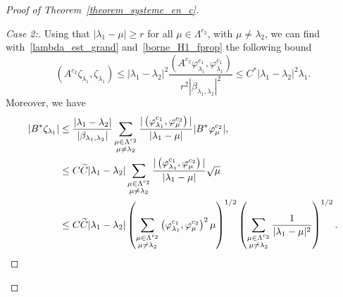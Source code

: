 \documentclass[AHL,Unicode,longabstracts]{cedram}
\newenvironment{step}[1]{\begin{proof}[#1]}{\let\qed\relax\end{proof}}
\newcommand{\fprop}[2]{\varphi^{#1}_{#2}}
\let\oldtilde\tilde
\renewcommand*{\tilde}[1]{\mathchoice{\widetilde{#1}}{\widetilde{#1}}{\oldtilde{#1}}{\oldtilde{#1}}}\let\oldexists\exists
\renewcommand*{\exists}{\mathrel{\oldexists}}
\begin{document}
\begin{proof}[Proof of Theorem~\ref{theorem_systeme_en_c}]
\begin{step}{Case 2:}
Using that $|\lambda_1-\mu|\geq r$ for all $\mu\in \Lambda^{c_2}$, with $\mu\neq \lambda_2$, we can find with~\eqref{lambda_est_grand} and~\eqref{borne_H1_fprop} the following bound
\begin{equation}\label{borne_chi_lambda1}
\left(A^{c_2} \zeta_{\lambda_1},\zeta_{\lambda_1}\right) \leq |\lambda_1-\lambda_2|^2 \frac{\left(A^{c_2} \fprop{c_1}{\lambda_1}, \fprop{c_1}{\lambda_1}\right)}{r^2|\beta_{\lambda_1,\lambda_2}|^2} \leq C^* |\lambda_1-\lambda_2|^2 \lambda_1.
\end{equation}
Moreover, we have
\begin{align*}
|B^* \zeta_{\lambda_1}| & \leq \frac{|\lambda_1-\lambda_2|}{|\beta_{\lambda_1,\lambda_2}|} \sum_{\substack{\mu\in \Lambda^{c_2}\\ \mu\neq \lambda_2}} \frac{|\left(\fprop{c_1}{\lambda_1}, \fprop{c_2}{\mu}\right)|}{|\lambda_1-\mu|} |B^* \fprop{c_2}{\mu}|, \\
& \leq C \tilde{C} |\lambda_1-\lambda_2| \sum_{\substack{\mu\in \Lambda^{c_2}\\ \mu\neq \lambda_2}} \frac{|\left(\fprop{c_1}{\lambda_1}, \fprop{c_2}{\mu}\right)|}{|\lambda_1-\mu|} \sqrt{\mu} \\
& \leq C \tilde{C} |\lambda_1-\lambda_2| \left(\sum_{\substack{\mu\in \Lambda^{c_2}\\ \mu\neq \lambda_2}} \left(\fprop{c_1}{\lambda_1}, \fprop{c_2}{\mu}\right)^2\mu \right)^{1/2} \left(\sum_{\substack{\mu\in \Lambda^{c_2}\\ \mu\neq \lambda_2}} \frac{1}{|\lambda_1-\mu|^2} \right)^{1/2}.
\end{align*}


\end{step}
\end{proof}
\end{document}
